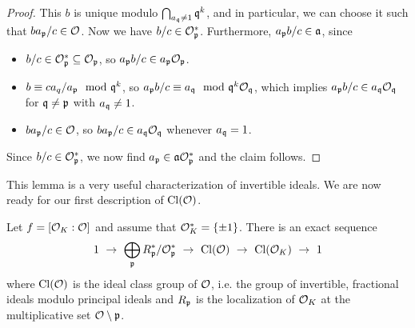 \begin{proof}
    This $b$ is unique modulo $\bigcap_{a_\q \neq 1} \q^k$, and in particular, we can choose it such that $ba_\p/c \in \O$.
    Now we have $b/c \in \O_\p^*$.
    Furthermore, $a_\p b/c \in \a$, since
    \begin{itemize}
        \item $b/c \in \O_\p^* \subseteq \O_\p$, so $a_\p b/c \in a_\p\O_\p$.
        \item $b \equiv ca_q/a_\p \mod \q^k$, so $a_\p b/c \equiv a_\q \mod \q^k\O_\q$, which implies $a_\p b/c \in a_\q\O_\q$ for $\q \neq \p$ with $a_\q \neq 1$.
        \item $ba_\p/c \in \O$, so $ba_\p/c \in a_\q\O_\q$ whenever $a_\q = 1$.
    \end{itemize}
    Since $b/c \in \O_\p^*$, we now find $a_\p \in \a\O_\p^*$ and the claim follows.
\end{proof}
This lemma is a very useful characterization of invertible ideals.
We are now ready for our first description of $\Cl(\O)$.
\begin{lemma}
    Let $f = [\O_K : \O]$ and assume that $\O_K^* = \{ \pm 1 \}$.
    There is an exact sequence
    \begin{equation*}
        1 \ \to \ \bigoplus_\p R_\p^*/\O_\p^* \ \to \ \Cl(\O) \ \to \ \Cl(\O_K) \ \to \ 1
    \end{equation*}
    where $\Cl(\O)$ is the ideal class group of $\O$, i.e. the group of invertible, fractional ideals modulo principal ideals and $R_\p$ is the localization of $\O_K$ at the multiplicative set $\O \setminus \p$.
\end{lemma}
